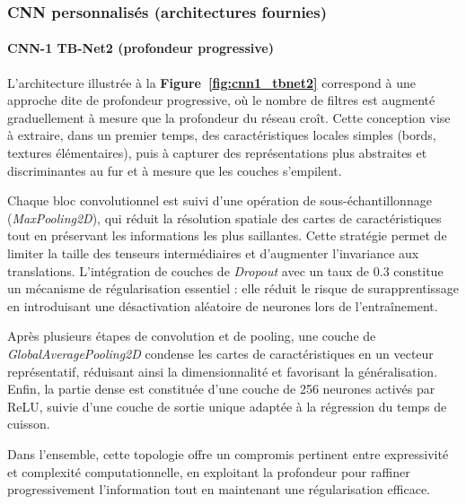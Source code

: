   \subsubsection{CNN personnalisés (architectures fournies)}

\paragraph{CNN-1 TB-Net2 (profondeur progressive)}
L’architecture illustrée à la \textbf{Figure~\ref{fig:cnn1_tbnet2}} correspond à une approche dite de profondeur progressive, où le nombre de filtres est augmenté graduellement à mesure que la profondeur du réseau croît. Cette conception vise à extraire, dans un premier temps, des caractéristiques locales simples (bords, textures élémentaires), puis à capturer des représentations plus abstraites et discriminantes au fur et à mesure que les couches s’empilent.  

Chaque bloc convolutionnel est suivi d’une opération de sous-échantillonnage (\textit{MaxPooling2D}), qui réduit la résolution spatiale des cartes de caractéristiques tout en préservant les informations les plus saillantes. Cette stratégie permet de limiter la taille des tenseurs intermédiaires et d’augmenter l’invariance aux translations. L’intégration de couches de \textit{Dropout} avec un taux de 0.3 constitue un mécanisme de régularisation essentiel : elle réduit le risque de surapprentissage en introduisant une désactivation aléatoire de neurones lors de l’entraînement.  

Après plusieurs étapes de convolution et de pooling, une couche de \textit{GlobalAveragePooling2D} condense les cartes de caractéristiques en un vecteur représentatif, réduisant ainsi la dimensionnalité et favorisant la généralisation. Enfin, la partie dense est constituée d’une couche de 256 neurones activés par ReLU, suivie d’une couche de sortie unique adaptée à la régression du temps de cuisson.  

Dans l’ensemble, cette topologie offre un compromis pertinent entre expressivité et complexité computationnelle, en exploitant la profondeur pour raffiner progressivement l’information tout en maintenant une régularisation efficace.  

